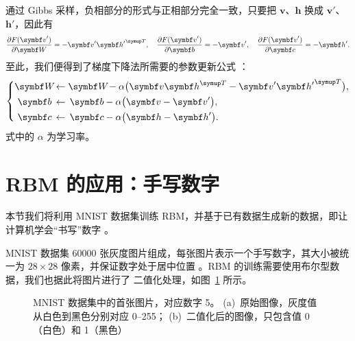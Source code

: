 通过 Gibbs 采样，负相部分的形式与正相部分完全一致，只要把 $\bm{v}$、$\bm{h}$ 换成 $\bm{v}'$、
$\bm{h}'$，因此有
\begin{equation}
  \pdv{F(\bm{v}')}{\bm{W}} = - \bm{v}' {\bm{h}'}^\trans \qc
  \pdv{F(\bm{v}')}{\bm{b}} = - \bm{v}' \qc
  \pdv{F(\bm{v}')}{\bm{c}} = - \bm{h}'.
\end{equation}
至此，我们便得到了梯度下降法所需要的参数更新公式 \cite{zhouzhihua,hinton2012practical}：
\begin{equation}
  \left\{
  \begin{aligned}
    \bm{W} \! &\gets \bm{W} \! - \alpha \qty\big(\bm{v} \bm{h}^\trans
                                                 - \bm{v}' {\bm{h}'}^\trans), \\
    \bm{b} \, &\gets \, \bm{b} - \alpha \qty\big(\bm{v} - \bm{v}'), \\
    \bm{c} \, &\gets \, \bm{c} - \alpha \qty\big(\bm{h} - \bm{h}').
  \end{aligned}
  \right.
\end{equation}
式中的 $\alpha$ 为学习率。

\section{RBM 的应用：手写数字}
\label{sec:rbm-mnist}

本节我们将利用 MNIST 数据集训练 RBM，并基于已有数据生成新的数据，即让计算机学会“书写”数字
\cite{rbmonline,lyy1994rbm}。

MNIST 数据集 \num{60000} 张灰度图片组成，每张图片表示一个手写数字，其大小被统一为 $28 \times 28$
像素，并保证数字处于居中位置 \cite{mnist}。RBM 的训练需要使用布尔型数据，我们也据此将图片进行了
二值化处理，如图~\ref{fig:mnist-image} 所示。

\begin{figure}[htb]
  \centering
  \begin{subfigure}[b]{0.35\textwidth}
    \centering
    \caption{}
  \end{subfigure}
  \begin{subfigure}[b]{0.35\textwidth}
    \centering
    \caption{}
  \end{subfigure}
  \caption{MNIST 数据集中的首张图片，对应数字 5。
    (a)~原始图像，灰度值从白色到黑色分别对应 0--255；
    (b)~二值化后的图像，只包含值 0（白色）和 1（黑色）}
  \label{fig:mnist-image}
\end{figure}

